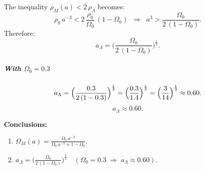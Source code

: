 \documentclass{article}
\begin{document}
The inequality \(\rho_M(a) < 2\,\rho_\Lambda\) becomes:
\[
\rho_0\,a^{-3}
< 2 \,\frac{\rho_0}{\Omega_0}\,(1-\Omega_0)
\;\;\Longrightarrow\;\;
a^3
> \frac{\Omega_0}{2\,(1-\Omega_0)}.
\]
Therefore:
\[
a_\Lambda
= \biggl(\frac{\Omega_0}{2\,(1-\Omega_0)}\biggr)^{\frac{1}{3}}.
\]

\subparagraph{With \(\Omega_0 = 0.3\)}
\[
a_\Lambda
= \Bigl(\frac{0.3}{2\,(1-0.3)}\Bigr)^{\frac{1}{3}}
= \Bigl(\frac{0.3}{1.4}\Bigr)^{\frac{1}{3}}
= \Bigl(\frac{3}{14}\Bigr)^{\frac{1}{3}}
\approx 0.60.
\]
\[
\boxed{ a_\Lambda \approx 0.60. }
\]

\bigskip

\noindent
\textbf{Conclusions:}
\begin{enumerate}
    \item \(\displaystyle \Omega_M(a)
    = \frac{\Omega_0\,a^{-3}}
    {\Omega_0\,a^{-3} + 1 - \Omega_0}.\)
    \item \(\displaystyle a_\Lambda
    = \biggl(\frac{\Omega_0}{2\,(1-\Omega_0)}\biggr)^{\!\frac{1}{3}}
    \quad(\Omega_0=0.3 \;\Rightarrow\; a_\Lambda \approx 0.60).\)
\end{enumerate}
\end{document}
